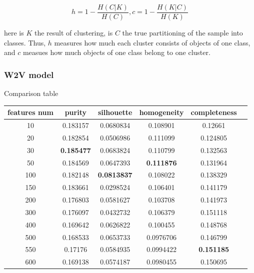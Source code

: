 \documentclass[11pt]{article}
\begin{document}
\begin{equation}
h = 1 - \frac{H(C|K)}{H(C)}, c = 1 - \frac{H(K|C)}{H(K)}
\end{equation}

here is $K$ the result of clustering, is $C$ the true partitioning of the sample into classes. Thus, $h$ measures how much each cluster consists of objects of one class, and $c$ measues how much objects of one class belong to one cluster.
\subsubsection{W2V model}

Comparison table

\begin{center}
\begin{tabular}{ |c|c|c|c|c|c| }
\hline
features num & purity  & silhouette  & homogeneity  & completeness\\ \hline 
10  & 0.183157  & 0.0680834  & 0.108901  & 0.12661\\ \hline 
20  & 0.182854  & 0.0506986  & 0.111099  & 0.124805\\ \hline 
30  & \textbf{0.185477}  & 0.0683824  & 0.110799  & 0.132563\\ \hline 
50  & 0.184569  & 0.0647393  & \textbf{0.111876}  & 0.131964\\ \hline 
100  & 0.182148  & \textbf{0.0813837}  & 0.108022  & 0.138329\\ \hline 
150  & 0.183661  & 0.0298524  & 0.106401  & 0.141179\\ \hline 
200  & 0.176803  & 0.0581627  & 0.103708  & 0.141973\\ \hline 
300  & 0.176097  & 0.0432732  & 0.106379  & 0.151118\\ \hline 
400  & 0.169642  & 0.0626822  & 0.100455  & 0.148768\\ \hline 
500  & 0.168533  & 0.0653733  & 0.0976706  & 0.146799\\ \hline 
550  & 0.17176  & 0.0584935  & 0.0994422  & \textbf{0.151185}\\ \hline 
600  & 0.169138  & 0.0574187  & 0.0980455  & 0.150695\\ \hline \end{tabular}
\end{center}
\FloatBarrier
\end{document}
